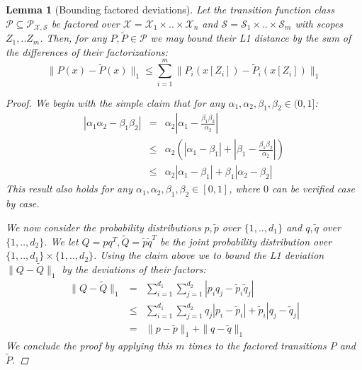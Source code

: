 \documentclass{article}
\newtheorem{lemma}{Lemma}
\newcommand{\Xc}{\mathcal{X}}
\newcommand{\Pc}{\mathcal{P}}
\newcommand{\Sc}{\mathcal{S}}
\begin{document}
\begin{lemma}[Bounding factored deviations]
\label{lem: factor bound} \hspace{0.000000001mm} \newline
Let the transition function class $\Pc \subseteq \Pc_{\Xc,\Sc}$ be factored over $\Xc = \Xc_1 \times .. \times \Xc_n$ and $\Sc = \Sc_1 \times .. \times \Sc_m$ with scopes  $Z_1, .. Z_m$.
Then, for any $P,\tilde{P} \in \Pc$ we may bound their L1 distance by the sum of the differences of their factorizations:
$$ \| P(x) - \tilde{P}(x) \|_1 \le \sum_{i=1}^m \|P_i(x[Z_i]) - \tilde{P}_i(x[Z_i]) \|_1 $$

\begin{proof}
We begin with the simple claim that for any $ \alpha_1, \alpha_2, \beta_1, \beta_2 \in (0,1]$:
\begin{eqnarray*}
	| \alpha_1 \alpha_2 - \beta_1 \beta_2 | &=& \alpha_2 \left| \alpha_1 - \frac{\beta_1 \beta_2}{\alpha_2} \right| \\
	&\le& \alpha_2 \left( \left|\alpha_1 - \beta_1 \right| + \left|\beta_1 - \frac{\beta_1 \beta_2}{\alpha_2} \right| \right) \\
	&\le& \alpha_2 \left| \alpha_1 - \beta_1 \right| + \beta_1 \left| \alpha_2 - \beta_2 \right|
\end{eqnarray*}
This result also holds for any $ \alpha_1, \alpha_2, \beta_1, \beta_2 \in [0,1]$, where $0$ can be verified case by case.

We now consider the probability distributions $p, \tilde{p} $ over $\{1,..,d_1\}$ and $q,\tilde{q} $ over $\{1,..,d_2\}$.
We let $Q = p q^T, \tilde{Q} = \tilde{p} \tilde{q}^T$ be the joint probability distribution over $\{1,..,d_1\} \times \{1,..,d_2\}$.
Using the claim above we to bound the L1 deviation $\| Q - \tilde{Q} \|_1$ by the deviations of their factors:
\begin{eqnarray*}
	\| Q - \tilde{Q} \|_1 %
	&=& \sum_{i=1}^{d_1} \sum_{j=1}^{d_2} | p_i q_j - \tilde{p}_i \tilde{q}_j | \\
	&\le& \sum_{i=1}^{d_1} \sum_{j=1}^{d_2} q_j | p_i - \tilde{p}_i | + \tilde{p}_i | q_j - \tilde{q}_j | \\
	&=& \| p - \tilde{p} \|_1 + \|q - \tilde{q} \|_1
\end{eqnarray*}
We conclude the proof by applying this $m$ times to the factored transitions $P$ and $\tilde{P}$.
\end{proof}
\end{lemma}
\end{document}
